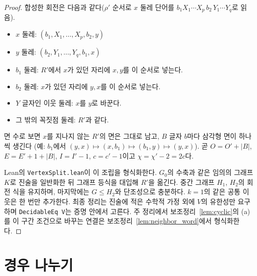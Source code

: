 \begin{proof}
합성한 회전은 다음과 같다(\(\rho'\) 순서로 \(x\) 둘레 단어를 \(b_1 X_1 \cdots X_p\, b_2\, Y_1 \cdots Y_q\)로 읽음).
\begin{itemize}
  \item \(x\) 둘레: \((b_1, X_1, \ldots, X_p, b_2, y)\)
  \item \(y\) 둘레: \((b_2, Y_1, \ldots, Y_q, b_1, x)\)
  \item \(b_1\) 둘레: \(R'\)에서 \(x\)가 있던 자리에 \(x, y\)를 이 순서로 넣는다.
  \item \(b_2\) 둘레: \(x\)가 있던 자리에 \(y, x\)를 이 순서로 넣는다.
  \item \(Y\) 글자인 이웃 둘레: \(x\)를 \(y\)로 바꾼다.
  \item 그 밖의 꼭짓점 둘레: \(R'\)과 같다.
\end{itemize}
면 수로 보면 \(x\)를 지나지 않는 \(R'\)의 면은 그대로 남고, \(B\) 글자 \(b\)마다 삼각형 면이 하나씩 생긴다
(예: \(b_1\)에서 \((y, x) \mapsto (x, b_1) \mapsto (b_1, y) \mapsto (y, x)\)). 곧 \(O = O' + |B|\),
\(E = E' + 1 + |B|\), \(I = I' - 1\), \(c = c' - 1\)이고 \(\chi = \chi' - 2 = 2c\)다.

Lean의 \texttt{VertexSplit.lean}이 이 조립을 형식화한다. \(G_0\)의 수축과 같은 임의의 그래프 \(K\)로
진술을 일반화한 뒤 그래프 등식을 대입해 \(R'\)을 옮긴다. 중간 그래프 \(H_1\), \(H_2\)의 회전 식을 유지하며,
마지막에는 \(G \le H_2\)와 단조성으로 충분하다. \(k=1\)의 같은 공통 이웃은 한 번만 추가한다.
최종 정리는 진술에 적은 수학적 가정 외에 \(V\)의 유한성만 요구하며 \texttt{DecidableEq V}는 증명 안에서 고른다.
주 정리에서 보조정리~\ref{lem:cyclic}의 (a)를 이 구간 조건으로 바꾸는 연결은
보조정리~\ref{lem:neighbor_word}에서 형식화한다.
\end{proof}

\section{경우 나누기}

